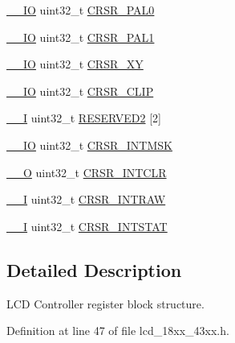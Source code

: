 \begin{DoxyCompactItemize}
\hyperlink{core__sc300_8h_aec43007d9998a0a0e01faede4133d6be}{\+\_\+\+\_\+\+IO} uint32\+\_\+t \hyperlink{struct_l_p_c___l_c_d___t_ae791a314c1f277d155aef32843abfd3b}{C\+R\+S\+R\+\_\+\+P\+A\+L0}
\item 
\hyperlink{core__sc300_8h_aec43007d9998a0a0e01faede4133d6be}{\+\_\+\+\_\+\+IO} uint32\+\_\+t \hyperlink{struct_l_p_c___l_c_d___t_aa3cb594358b5c6235358dafa4b6616e2}{C\+R\+S\+R\+\_\+\+P\+A\+L1}
\item 
\hyperlink{core__sc300_8h_aec43007d9998a0a0e01faede4133d6be}{\+\_\+\+\_\+\+IO} uint32\+\_\+t \hyperlink{struct_l_p_c___l_c_d___t_a8f916e4f2590faff6e6baa1addd9b35a}{C\+R\+S\+R\+\_\+\+XY}
\item 
\hyperlink{core__sc300_8h_aec43007d9998a0a0e01faede4133d6be}{\+\_\+\+\_\+\+IO} uint32\+\_\+t \hyperlink{struct_l_p_c___l_c_d___t_a01a585673ff328205882f072cac8312c}{C\+R\+S\+R\+\_\+\+C\+L\+IP}
\item 
\hyperlink{core__sc300_8h_af63697ed9952cc71e1225efe205f6cd3}{\+\_\+\+\_\+I} uint32\+\_\+t \hyperlink{struct_l_p_c___l_c_d___t_a24e2a8eca355196506dfe85a38d5f707}{R\+E\+S\+E\+R\+V\+E\+D2} \mbox{[}2\mbox{]}
\item 
\hyperlink{core__sc300_8h_aec43007d9998a0a0e01faede4133d6be}{\+\_\+\+\_\+\+IO} uint32\+\_\+t \hyperlink{struct_l_p_c___l_c_d___t_a068610434ae30cbe9f79a282999e0bbc}{C\+R\+S\+R\+\_\+\+I\+N\+T\+M\+SK}
\item 
\hyperlink{core__sc300_8h_a7e25d9380f9ef903923964322e71f2f6}{\+\_\+\+\_\+O} uint32\+\_\+t \hyperlink{struct_l_p_c___l_c_d___t_abfa32c24adcbaa602ae75ef51a360091}{C\+R\+S\+R\+\_\+\+I\+N\+T\+C\+LR}
\item 
\hyperlink{core__sc300_8h_af63697ed9952cc71e1225efe205f6cd3}{\+\_\+\+\_\+I} uint32\+\_\+t \hyperlink{struct_l_p_c___l_c_d___t_a94c53169c25d1f254d25f1256d288f15}{C\+R\+S\+R\+\_\+\+I\+N\+T\+R\+AW}
\item 
\hyperlink{core__sc300_8h_af63697ed9952cc71e1225efe205f6cd3}{\+\_\+\+\_\+I} uint32\+\_\+t \hyperlink{struct_l_p_c___l_c_d___t_af41388006ec38b4c247aa0de2e85097c}{C\+R\+S\+R\+\_\+\+I\+N\+T\+S\+T\+AT}
\end{DoxyCompactItemize}


\subsection{Detailed Description}
L\+CD Controller register block structure. 

Definition at line 47 of file lcd\+\_\+18xx\+\_\+43xx.\+h.



